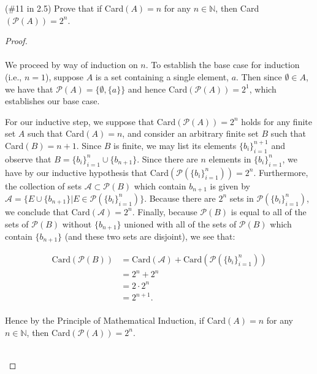 (\#11 in 2.5) Prove that if Card$(A) = n$ for any $n\in \mathbb{N}$, then
Card$(\mathcal{P}(A))=2^n$.

    \begin{proof}\ \\\\
        We proceed by way of induction on $n$. To establish the base case for
        induction (i.e., $n = 1$), suppose $A$ is a set containing a single
        element, $a$. Then since $\emptyset \in A$, we have that
        $\mathcal{P}(A) = \{\emptyset, \{a\}\}$ and hence 
        Card$\left(\mathcal{P}(A)\right) = 2^1$, which establishes our base
        case.

        For our inductive step, we suppose that 
        Card$\left(\mathcal{P}(A)\right) = 2^n$ holds for any finite set $A$
        such that Card$(A) = n$, and consider an arbitrary finite set $B$ such
        that Card$(B) = n + 1$. Since $B$ is finite, we may list its elements
        $\{b_i\}_{i=1}^{n+1}$ and observe that 
        $B = \{b_i\}_{i=1}^n \cup \{b_{n+1}\}$. Since there are $n$ elements in
        $\{b_i\}_{i=1}^n$, we have by our inductive hypothesis that
        Card$\left(\mathcal{P}\left(\{b_i\}_{i=1}^n\right)\right) = 2^n$.
        Furthermore, the collection of sets $\mathcal{A} \subset \mathcal{P}(B)$
        which contain
        $b_{n+1}$ is given by $\mathcal{A} = \{E \cup \{b_{n+1}\} | E \in \mathcal{P}\left(\{b_i\}_{i=1}^n\right)\}$.
        Because there are $2^n$ sets in $\mathcal{P}\left(\{b_i\}_{i=1}^n\right)$,
        we conclude that Card$(\mathcal{A}) = 2^n$. Finally, because
        $\mathcal{P}(B)$ is equal to all of the sets of $\mathcal{P}(B)$
        without $\{b_{n+1}\}$ unioned with all of the sets of $\mathcal{P}(B)$
        which contain $\{b_{n+1}\}$ (and these two sets are disjoint), we
        see that:

        \begin{align*}
            \text{Card}\left(\mathcal{P}(B)\right) 
              &= \text{Card}\left(\mathcal{A}\right)
                 + \text{Card}\left(\mathcal{P}\left(\{b_i\}_{i=1}^n\right)\right) \\
              &= 2^n + 2^n \\
              &= 2 \cdot 2^n \\
              &= 2^{n+1}. \\
        \end{align*}

        Hence by the Principle of Mathematical Induction, if Card$(A) = n$ for
        any $n \in \mathbb{N}$, then Card$\left(\mathcal{P}(A)\right) = 2^n$.

        \ \\
    \end{proof}